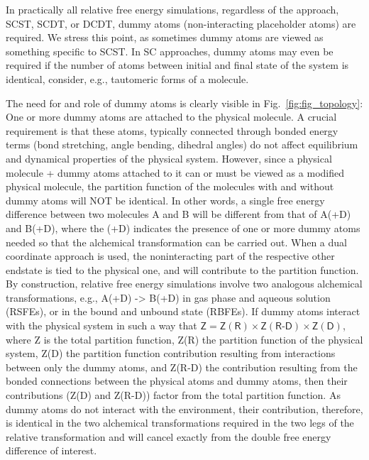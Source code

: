 \documentclass[9pt,bestpractices]{livecoms}
\begin{document}
In practically all relative free energy simulations, regardless of the approach, SCST, SCDT, or DCDT, dummy atoms (non-interacting placeholder atoms) are required. We stress this point, as sometimes dummy atoms are viewed as something specific to SCST. In SC approaches, dummy atoms may even be required if the number of atoms between initial and final state of the system is identical, consider, e.g., tautomeric forms of a molecule.

The need for and role of dummy atoms is clearly visible in Fig.~\ref{fig:fig_topology}: One or more dummy atoms are attached to the physical molecule. A crucial requirement is that these atoms, typically connected through bonded energy terms (bond stretching, angle bending, dihedral angles) do not affect equilibrium and dynamical properties of the physical system. However, since a physical molecule + dummy atoms attached to it can or must be viewed as a modified physical molecule, the partition function of the molecules with and without dummy atoms will NOT be identical. In other words, a single free energy difference between two molecules A and B will be different from that of A(+D) and B(+D), where the (+D) indicates the presence of one or more dummy atoms needed so that the alchemical transformation can be carried out. When a dual coordinate approach is used, the noninteracting part of the respective other endstate is tied to the physical one, and will contribute to the partition function. By construction, relative free energy simulations involve two analogous alchemical transformations, e.g., A(+D) -> B(+D) in gas phase and aqueous solution (RSFEs), or in the bound and unbound state (RBFEs). If dummy atoms  interact with the physical system in such a way that $\mathsf{Z = Z(R) \times Z(R\text{-}D) \times Z(D)}$, where Z is the total partition function, Z(R) the partition function of the physical system, Z(D) the partition function contribution resulting from interactions between only the dummy atoms, and Z(R-D) the contribution resulting from the bonded connections between the physical atoms and dummy atoms, then their contributions (Z(D) and Z(R-D)) factor from the total partition function. As dummy atoms do not interact with the environment, their contribution, therefore, is identical in the two alchemical transformations required in the two legs of the relative transformation and will cancel exactly from the double free energy difference of interest.
\end{document}

